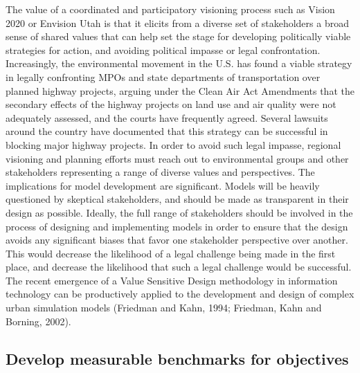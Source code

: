 The value of a coordinated and participatory visioning process such as Vision 2020 or Envision Utah is that it elicits from a diverse set of stakeholders a broad sense of shared values that can help set the stage for developing politically viable strategies for action, and avoiding political impasse or legal confrontation.  Increasingly, the environmental movement in the U.S. has found a viable strategy in legally confronting MPOs and state departments of transportation over planned highway projects, arguing under the Clean Air Act Amendments that the secondary effects of the highway projects on land use and air quality were not adequately assessed, and the courts have frequently agreed.  Several lawsuits around the country have documented that this strategy can be successful in blocking major highway projects.  In order to avoid such legal impasse, regional visioning and planning efforts must reach out to environmental groups and other stakeholders representing a range of diverse values and perspectives.  The implications for model development are significant.  Models will be heavily questioned by skeptical stakeholders, and should be made as transparent in their design as possible.  Ideally, the full range of stakeholders should be involved in the process of designing and implementing models in order to ensure that the design avoids any significant biases that favor one stakeholder perspective over another.  This would decrease the likelihood of a legal challenge being made in the first place, and decrease the likelihood that such a legal challenge would be successful.  The recent emergence of a Value Sensitive Design methodology in information technology can be productively applied to the development and design of complex urban simulation models (Friedman and Kahn, 1994; Friedman, Kahn and Borning, 2002).

\subsection{Develop measurable benchmarks for objectives}

